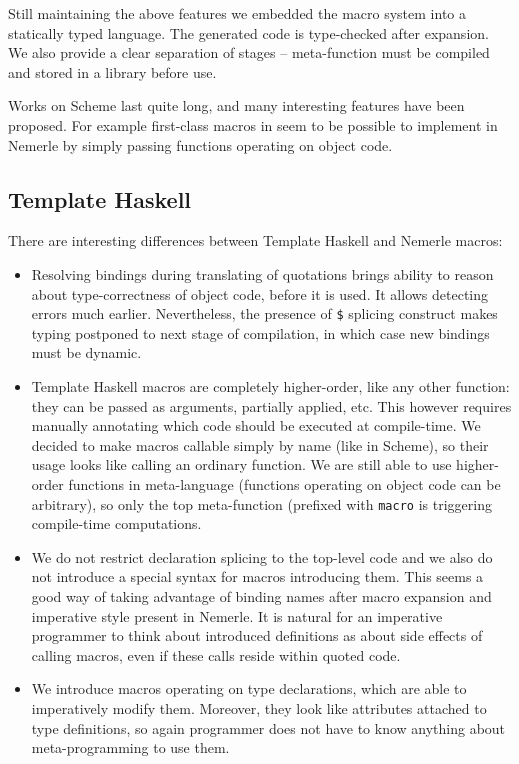 \documentclass{llncs}
\begin{document}
Still maintaining the above features we embedded the macro system into a statically typed
language. The generated code is type-checked after expansion. We also provide a clear
separation of stages -- meta-function must be compiled and stored in a library
before use.

Works on Scheme last quite long, and many interesting features have been proposed.
For example first-class macros in \cite{Macros:FirstClass} seem to be possible
to implement in Nemerle by simply passing functions operating on object code.

\subsection{Template Haskell}
There are interesting differences between Template Haskell \cite{Haskell:Meta} 
and Nemerle macros:
\begin{itemize}
\item Resolving bindings during translating of quotations brings ability to reason
  about type-correctness of object code, before it is used. It allows detecting
  errors much earlier. Nevertheless, the presence of \verb,$, splicing construct makes %
  typing postponed to next stage of compilation, in which case new bindings 
  must be dynamic.
\item Template Haskell macros are completely higher-order, like any other 
  function: they can be passed as arguments, partially applied, etc. This
  however requires manually annotating which code should be executed at 
  compile-time. We decided to make macros callable simply by name (like in Scheme), 
  so their usage looks like calling an ordinary function. We are still able to use 
  higher-order functions in meta-language (functions operating on object code can 
  be arbitrary), so only the top meta-function (prefixed with \verb,macro, is 
  triggering compile-time computations.
\item We do not restrict declaration splicing to the top-level code and we also do not
  introduce a special syntax for macros introducing them. This seems a good way of
  taking advantage of binding names after macro expansion and imperative style
  present in Nemerle. It is natural for an imperative programmer to think about introduced 
  definitions as about side effects of calling macros, even if these calls reside within
  quoted code.
\item We introduce macros operating on type declarations, which are able to imperatively
  modify them. Moreover, they look like attributes attached to type definitions, so
  again programmer does not have to know anything about meta-programming to use them.
\end{itemize}
\end{document}
